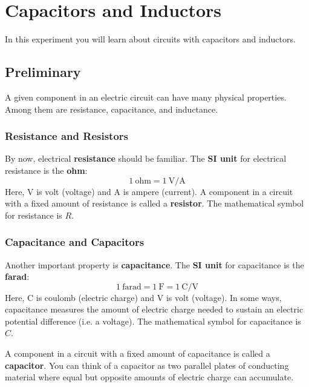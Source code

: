 \setcounter{chapter}{4}
\chapter{Capacitors and Inductors}
%
In this experiment you will learn about circuits with capacitors and inductors.
%
\section{Preliminary}
%
A given component in an electric circuit can have many physical properties. Among them are resistance, capacitance, and inductance.
%
\subsection{Resistance and Resistors}
%
By now, electrical \textbf{resistance} should be familiar. The \textbf{SI unit} for electrical resistance is the \textbf{ohm}:
\begin{equation}
	1 \ \text{ohm} = 1 \ \text{V/A}
\end{equation}
Here, V is volt (voltage) and A is ampere (current). A component in a circuit with a fixed amount of resistance is called a \textbf{resistor}. The mathematical symbol for resistance is $R$.
%
\subsection{Capacitance and Capacitors}
%
Another important property is \textbf{capacitance}. The \textbf{SI unit} for capacitance is the \textbf{farad}:
\begin{equation}
	1 \ \text{farad} = 1 \ \text{F} = 1 \ \text{C/V}
\end{equation}
Here, C is coulomb (electric charge) and V is volt (voltage). In some ways, capacitance measures the amount of electric charge needed to sustain an electric potential difference (i.e. a voltage). The mathematical symbol for capacitance is $C$.

A component in a circuit with a fixed amount of capacitance is called a \textbf{capacitor}. You can think of a capacitor as two parallel plates of conducting material where equal but opposite amounts of electric charge can accumulate.
%
